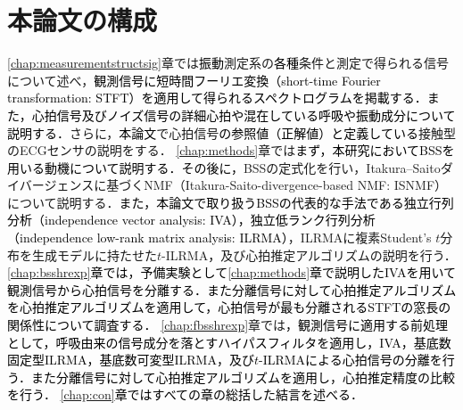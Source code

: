 \section{本論文の構成}
\ref{chap:measurementstructsig}章では\textcolor{black}{振動}測定系の\textcolor{black}{各種}条件と測定で得られる信号について述べ，\textcolor{black}{観測信号に短時間フーリエ変換（short-time Fourier transformation: STFT）を適用して得られるスペクトログラムを掲載する．また，\textcolor{black}{心拍信号及びノイズ信号の詳細}心拍や混在している呼吸や振動成分について説明する．}さらに，\textcolor{black}{本論文}で心拍信号\textcolor{black}{の参照値（正解値）と定義している}接触型のECGセンサの説明をする．
\ref{chap:methods}章では\textcolor{black}{まず，本研究においてBSSを用いる動機について説明する．その後に，}BSSの定式化を行い，Itakura--Saitoダイバージェンスに基づくNMF（Itakura-Saito-divergence-based NMF: ISNMF\textcolor{black}{\cite{isnmf}}）について説明する．\textcolor{black}{また，本論文で取り扱うBSSの代表的な手法である独立行列分析（independence vector analysis: IVA\textcolor{black}{\cite{Kim2007_iva, auxIVA}}），独立低ランク行列分析（independence low-rank matrix analysis: ILRMA\textcolor{black}{\cite{ILRMA, Kitamura2018_ilrma}}）}，ILRMAに複素Student's $t$分布を生成モデルに持たせた$t$-ILRMA\textcolor{black}{\cite{tdist1, tdist2}，}及び心拍推定アルゴリズムの説明を行う．
\textcolor{black}{\ref{chap:bsshrexp}章では\textcolor{black}{，予備実験として}\ref{chap:methods}章で説明したIVAを用いて観測信号から心拍信号を分離する．また分離信号に対して心拍推定アルゴリズムを心拍推定アルゴリズムを適用して，心拍信号が最も分離されるSTFTの窓長の関係性について調査\textcolor{black}{する}．}
\ref{chap:fbsshrexp}章では\textcolor{black}{，}\textcolor{black}{観測信号に\textcolor{black}{適用する前処理として}，呼吸由来の信号成分を落とすハイパスフィルタを適用し，IVA，基底数固定型ILRMA，基底数可変型ILRMA，及び$t$-ILRMA\textcolor{black}{による}心拍信号の分離を行う．また分離信号に対して心拍推定アルゴリズムを適用し\textcolor{black}{，}心拍\textcolor{black}{推定精度}の比較を行う．
\ref{chap:con}章ではすべての章の総括した結言を述べる．}